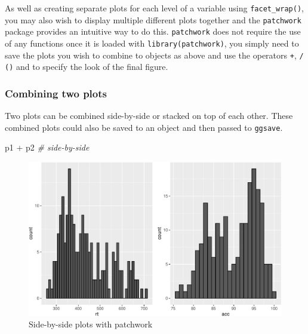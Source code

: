 \documentclass[
  english,
  doc,floatsintext]{apa6}
\newenvironment{Shaded}{\begin{snugshade}}{\end{snugshade}}
\newcommand{\CommentTok}[1]{\textcolor[rgb]{0.56,0.35,0.01}{\textit{#1}}}
\newcommand{\NormalTok}[1]{#1}
\newcommand{\SpecialCharTok}[1]{\textcolor[rgb]{0.00,0.00,0.00}{#1}}
\begin{document}
As well as creating separate plots for each level of a variable using \texttt{facet\_wrap()}, you may also wish to display multiple different plots together and the \texttt{patchwork} package provides an intuitive way to do this. \texttt{patchwork} does not require the use of any functions once it is loaded with \texttt{library(patchwork)}, you simply need to save the plots you wish to combine to objects as above and use the operators \texttt{+}, \texttt{/} \texttt{()} and \texttt{\textbar{}} to specify the look of the final figure.

\hypertarget{combining-two-plots}{%
\subsubsection{Combining two plots}\label{combining-two-plots}}

Two plots can be combined side-by-side or stacked on top of each other. These combined plots could also be saved to an object and then passed to \texttt{ggsave}.

\begin{Shaded}
\begin{Highlighting}[]
\NormalTok{p1 }\SpecialCharTok{+}\NormalTok{ p2 }\CommentTok{\# side{-}by{-}side}
\end{Highlighting}
\end{Shaded}

\begin{figure}

{\centering \includegraphics[width=1\linewidth]{images/patchwork-side-1} 

}

\caption{Side-by-side plots with patchwork}\label{fig:patchwork-side}
\end{figure}
\end{document}
